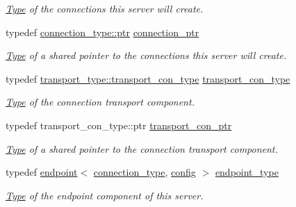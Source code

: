 \begin{DoxyCompactItemize}
\begin{DoxyCompactList}\small\item\em \mbox{\hyperlink{struct_type}{Type}} of the connections this server will create. \end{DoxyCompactList}\item 
\mbox{\label{classwebsocketpp_1_1server_a0b93f09ceae3d1dafd2f7b1da759c2ad}} 
typedef \mbox{\hyperlink{classwebsocketpp_1_1connection_ab910d42e3bde91546183cc54642f32ab}{connection\+\_\+type\+::ptr}} \mbox{\hyperlink{classwebsocketpp_1_1server_a0b93f09ceae3d1dafd2f7b1da759c2ad}{connection\+\_\+ptr}}
\begin{DoxyCompactList}\small\item\em \mbox{\hyperlink{struct_type}{Type}} of a shared pointer to the connections this server will create. \end{DoxyCompactList}\item 
\mbox{\label{classwebsocketpp_1_1server_a0515060720d024fb5d0ee7db1b4498a6}} 
typedef \mbox{\hyperlink{classwebsocketpp_1_1transport_1_1asio_1_1endpoint_a75f3102766fd3ba8230e99a2b0e00457}{transport\+\_\+type\+::transport\+\_\+con\+\_\+type}} \mbox{\hyperlink{classwebsocketpp_1_1server_a0515060720d024fb5d0ee7db1b4498a6}{transport\+\_\+con\+\_\+type}}
\begin{DoxyCompactList}\small\item\em \mbox{\hyperlink{struct_type}{Type}} of the connection transport component. \end{DoxyCompactList}\item 
\mbox{\label{classwebsocketpp_1_1server_af23763a1899c4636299f59f130570aab}} 
typedef transport\+\_\+con\+\_\+type\+::ptr \mbox{\hyperlink{classwebsocketpp_1_1server_af23763a1899c4636299f59f130570aab}{transport\+\_\+con\+\_\+ptr}}
\begin{DoxyCompactList}\small\item\em \mbox{\hyperlink{struct_type}{Type}} of a shared pointer to the connection transport component. \end{DoxyCompactList}\item 
\mbox{\label{classwebsocketpp_1_1server_a40f4d4bb132daf5164ccc290e9dbceb7}} 
typedef \mbox{\hyperlink{classwebsocketpp_1_1endpoint}{endpoint}}$<$ \mbox{\hyperlink{classwebsocketpp_1_1server_a82d3d94b70a49b2073c9b3378ec7047c}{connection\+\_\+type}}, \mbox{\hyperlink{classconfig}{config}} $>$ \mbox{\hyperlink{classwebsocketpp_1_1server_a40f4d4bb132daf5164ccc290e9dbceb7}{endpoint\+\_\+type}}
\begin{DoxyCompactList}\small\item\em \mbox{\hyperlink{struct_type}{Type}} of the endpoint component of this server. \end{DoxyCompactList}\end{DoxyCompactItemize}
